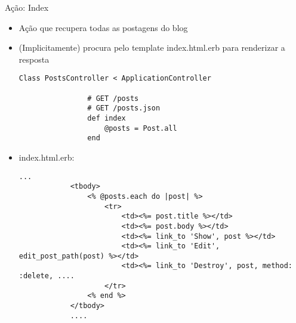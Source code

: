 \begin{frame}{Ação: Index}
	\begin{itemize}
		\item Ação que recupera \alert{todas as postagens} do blog
		\item (Implicitamente) procura pelo template \alert{index.html.erb} para renderizar a resposta
		\begin{lstlisting}[style=RubyInputStyle, caption=controllers/posts\_controller.rb]
			Class PostsController < ApplicationController
				
				# GET /posts
				# GET /posts.json
				def index
					@posts = Post.all
				end 
		\end{lstlisting}		
		\framebreak
		\item \alert{index.html.erb}:
		\begin{lstlisting}[style=RubyInputStyle, caption=views/posts/index.html.erb]
			...
			<tbody>
				<% @posts.each do |post| %>
					<tr>
						<td><%= post.title %></td>
						<td><%= post.body %></td>
						<td><%= link_to 'Show', post %></td>
						<td><%= link_to 'Edit', edit_post_path(post) %></td>
						<td><%= link_to 'Destroy', post, method: :delete, ....
					</tr>
				<% end %>
			</tbody>
			....
		\end{lstlisting}
	\end{itemize}	
\end{frame}